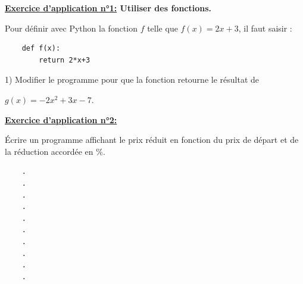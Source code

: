 \documentclass[12pt]{article}
\begin{document}
\begin{mdframed}[
    linewidth=1pt,
    roundcorner=5pt,
    linecolor=RoyalBlue,
    innertopmargin=10pt,
    innerbottommargin=10pt
]
{\color{RoyalBlue}
\textbf{\underline{Exercice d'application n°1:} Utiliser des fonctions.}}

\vspace{5pt}
Pour définir avec Python la fonction $f$ telle que $f(x) = 2x+3$, il faut saisir :

\begin{minipage}[t]{.45\textwidth}%
    \vspace{0pt}
    \begin{lstlisting}
    def f(x):
        return 2*x+3
    \end{lstlisting}
\end{minipage}%
\hfill
\begin{minipage}[t]{.45\textwidth}%
    \vspace{0pt}
    
\end{minipage}%

\hspace{1cm}1) Modifier le programme pour que la fonction retourne le résultat de 

\hspace{1.4cm} $g(x) = -2x^2+3x-7$.

\vspace{0.5cm}
{\color{black!45}\dotfill}

\vspace{0.5cm}
{\color{black!45}\dotfill}

\vspace{0.5cm}
{\color{black!45}\dotfill}

\vspace{0.5cm}
{\color{black!45}\dotfill}


\newpage
{\color{RoyalBlue}
\textbf{\underline{Exercice d'application n°2:}}}

\vspace{5pt}
Écrire un programme affichant le prix réduit en fonction du
prix de départ et de la réduction accordée en \%.

\begin{lstlisting}
    .
    .
    .
    .
    .
    .
    .
    .
    .
    .

\end{lstlisting}

\vspace{20pt}

\end{mdframed}
\end{document}
